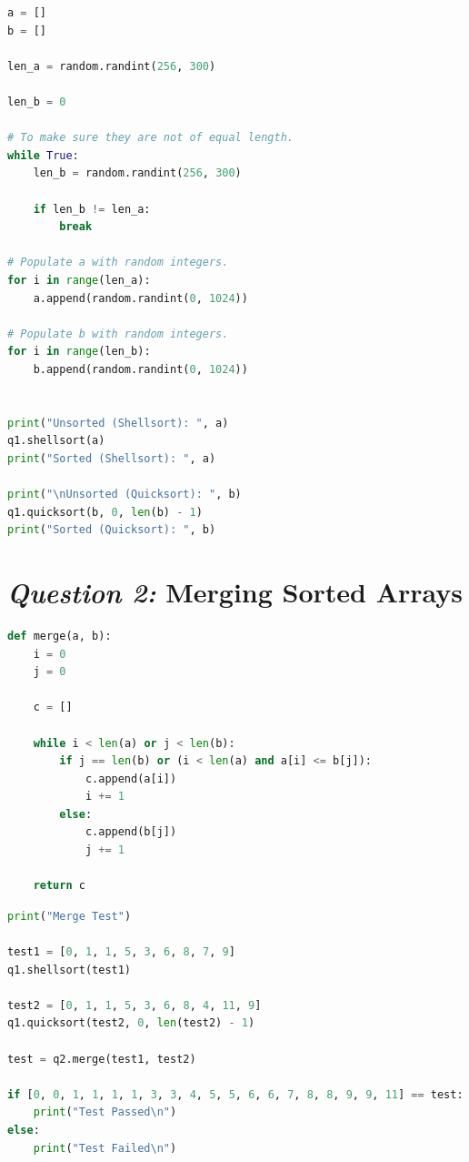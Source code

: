 \documentclass[12pt]{article}
\begin{document}
\begin{lstlisting}[caption={Test for \textit{Question 1} (2)},language=Python]
a = []
b = []

len_a = random.randint(256, 300)

len_b = 0

# To make sure they are not of equal length.
while True:
    len_b = random.randint(256, 300)

    if len_b != len_a:
        break

# Populate a with random integers.
for i in range(len_a):
    a.append(random.randint(0, 1024))

# Populate b with random integers.
for i in range(len_b):
    b.append(random.randint(0, 1024))


print("Unsorted (Shellsort): ", a)
q1.shellsort(a)
print("Sorted (Shellsort): ", a)

print("\nUnsorted (Quicksort): ", b)
q1.quicksort(b, 0, len(b) - 1)
print("Sorted (Quicksort): ", b)
\end{lstlisting}

\pagebreak

\section{\textit{Question 2:} Merging Sorted Arrays}

\begin{lstlisting}[caption={Merge implementation},language=Python]
def merge(a, b):
    i = 0
    j = 0

    c = []

    while i < len(a) or j < len(b):
        if j == len(b) or (i < len(a) and a[i] <= b[j]):
            c.append(a[i])
            i += 1
        else:
            c.append(b[j])
            j += 1

    return c
\end{lstlisting}

\begin{lstlisting}[caption={Test for \textit{Question 2} (1)},language=Python]
print("Merge Test")

test1 = [0, 1, 1, 5, 3, 6, 8, 7, 9]
q1.shellsort(test1)

test2 = [0, 1, 1, 5, 3, 6, 8, 4, 11, 9]
q1.quicksort(test2, 0, len(test2) - 1)

test = q2.merge(test1, test2)

if [0, 0, 1, 1, 1, 1, 3, 3, 4, 5, 5, 6, 6, 7, 8, 8, 9, 9, 11] == test:
    print("Test Passed\n")
else:
    print("Test Failed\n")
\end{lstlisting}
\end{document}
